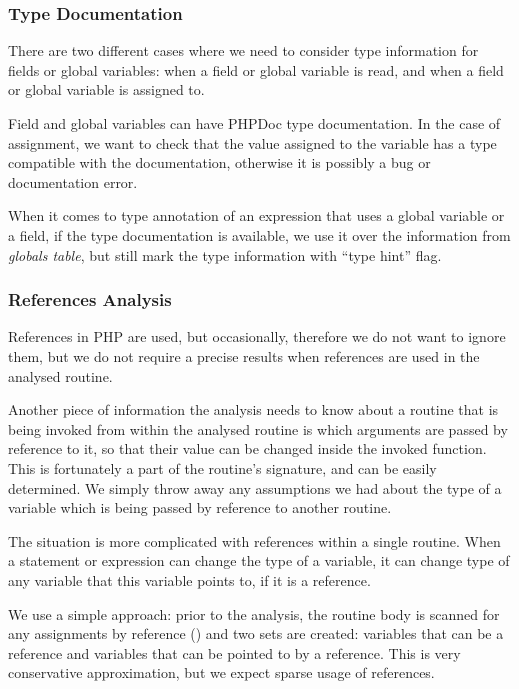         \subsubsection*{Type Documentation}
        There are two different cases where we need to consider type 
        information for fields or global variables: when a field or global 
        variable is read, and when a field or global variable is assigned to.
        
        Field and global variables can have PHPDoc type documentation.
        In the case of assignment, we want to check that the value assigned 
        to the variable has a type compatible with the documentation, 
        otherwise it is possibly a bug or documentation error.
        
        When it comes to type annotation of an expression that uses 
        a global variable or a field, if the type documentation is available, 
        we use it over the information from \emph{globals table}, 
        but still mark the type information with ``type hint'' flag.
        
        \subsubsection*{References Analysis}
        References in PHP are used, but occasionally, therefore we do 
        not want to ignore them, but we do not require a 
        precise results when references are used in 
        the analysed routine.
        
        Another piece of information the analysis needs to know 
        about a routine that is being invoked from within the 
        analysed routine is which arguments are passed by reference 
        to it, so that their value can be changed inside the 
        invoked function. This is fortunately a part of the 
        routine's signature, and can be easily determined. 
        We simply throw away any assumptions we had about the type 
        of a variable which is being passed by reference to 
        another routine.
        
        The situation is more complicated with references within a 
        single routine. When a statement or expression can change 
        the type of a variable, it can change type of any variable 
        that this variable points to, if it is a reference.
        
        We use a simple approach: prior to the analysis, the routine 
        body is scanned for any assignments by reference () 
        and two sets are created: variables that can be a reference and 
        variables that can be pointed to by a reference. This is very 
        conservative approximation, but we expect sparse usage of 
        references.
        
